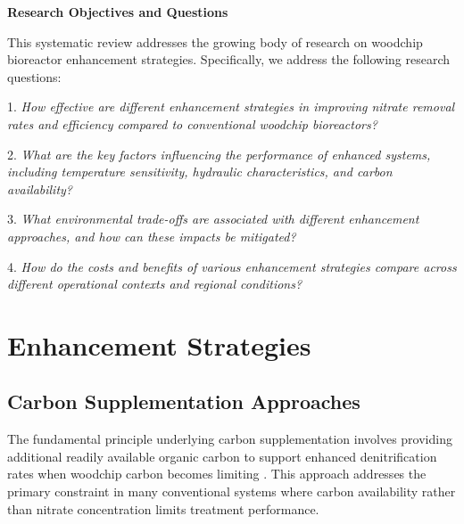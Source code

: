 \documentclass[12pt,a4paper]{article}
\begin{document}
\textbf{Research Objectives and Questions}

This systematic review addresses the growing body of research on woodchip bioreactor enhancement strategies.  Specifically, we address the following research questions:

1. \textit{How effective are different enhancement strategies in improving nitrate removal rates and efficiency compared to conventional woodchip bioreactors?}

2. \textit{What are the key factors influencing the performance of enhanced systems, including temperature sensitivity, hydraulic characteristics, and carbon availability?}

3. \textit{What environmental trade-offs are associated with different enhancement approaches, and how can these impacts be mitigated?}

4. \textit{How do the costs and benefits of various enhancement strategies compare across different operational contexts and regional conditions?}


\section{Enhancement Strategies}

\subsection{Carbon Supplementation Approaches}

 The fundamental principle underlying carbon supplementation involves providing additional readily available organic carbon to support enhanced denitrification rates when woodchip carbon becomes limiting \citep{RN242, RN258}. This approach addresses the primary constraint in many conventional systems where carbon availability rather than nitrate concentration limits treatment performance.
\end{document}
